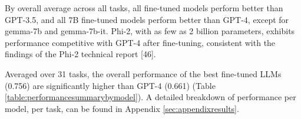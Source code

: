 By overall average across all tasks, all fine-tuned models perform better than GPT-3.5, and all 7B fine-tuned models perform better than GPT-4, except for gemma-7b and gemma-7b-it. Phi-2, with as few as 2 billion parameters, exhibits performance competitive with GPT-4 after fine-tuning, consistent with the findings of the Phi-2 technical report [46].

Averaged over 31 tasks, the overall performance of the best fine-tuned LLMs (0.756) are significantly higher than GPT-4 (0.661) (Table \ref{table:performancesummarybymodel}). A detailed breakdown of performance per model, per task, can be found in Appendix \ref{sec:appendixresults}.

\begin{table}[ht]
\centering
\footnotesize
\small
{}
\end{table}
